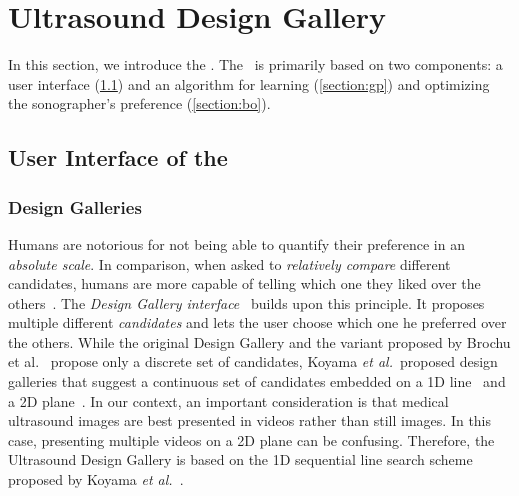 
\section{Ultrasound Design Gallery}\label{section:usdg}

In this section, we introduce the \usdg.
The \usdg~is primarily based on two components: a user interface (\cref{section:ui}) and an algorithm for learning (\cref{section:gp}) and optimizing the sonographer's preference (\cref{section:bo}).

\subsection{User Interface of the \usdg}\label{section:ui}
\subsubsection{Design Galleries}
Humans are notorious for not being able to quantify their preference in an \textit{absolute scale}.
In comparison, when asked to \textit{relatively compare} different candidates, humans are more capable of telling which one they liked over the others~\cite{10.2307/27821441, NIPS2007_b6a1085a}.
The \textit{Design Gallery interface}~\cite{10.1145/258734.258887} builds upon this principle.
It proposes multiple different \textit{candidates} and lets the user choose which one he preferred over the others.
While the original Design Gallery and the variant proposed by Brochu et al.~\cite{brochu_bayesian_2010} propose only a discrete set of candidates, Koyama \textit{et al.}~proposed design galleries that suggest a continuous set of candidates embedded on a 1D line~\cite{10.1145/3072959.3073598} and a 2D plane~\cite{koyama_sequential_2020}.
In our context, an important consideration is that medical ultrasound images are best presented in videos rather than still images.
In this case, presenting multiple videos on a 2D plane can be confusing.
Therefore, the Ultrasound Design Gallery is based on the 1D sequential line search scheme proposed by Koyama \textit{et al.}~\cite{10.1145/3072959.3073598}.

